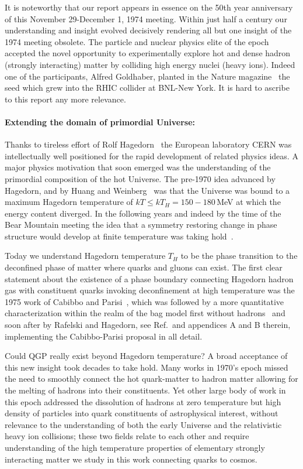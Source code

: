 It is noteworthy that our report appears in essence on the 50th year anniversary of this November 29-December 1, 1974 meeting. Within just half a century our understanding and insight evolved decisively rendering all but one insight of the 1974 meeting obsolete. The particle and nuclear physics elite  of the epoch accepted the novel opportunity to experimentally explore hot and dense hadron (strongly interacting) matter by colliding high energy nuclei (heavy ions). Indeed one of the participants, Alfred Goldhaber, planted in the Nature magazine~\cite{Goldhaber:1978qp} the seed which grew into the RHIC collider at BNL-New York. It is hard to ascribe to this report any more relevance.

\paragraph{Extending the domain of primordial Universe:}Thanks to tireless effort of Rolf Hagedorn~\cite{Rafelski:2016hnq} the European laboratory CERN was intellectually well positioned for the rapid development of related physics ideas. A major physics motivation that soon emerged was the understanding of the primordial composition of the hot Universe. The pre-1970 idea advanced by Hagedorn, and by Huang and Weinberg~\cite{Huang:1970iq} was that the Universe was bound to a maximum Hagedorn temperature of $kT\le kT_H=150-180$\,MeV at which the energy content diverged. In the following years and indeed by the time of the Bear Mountain meeting the idea that a symmetry restoring change in phase structure would develop at finite temperature was taking hold~\cite{Weinberg:1974hy,Harrington:1974fc}.

Today we understand Hagedorn temperature $T_H$ to be the phase transition to the deconfined phase of matter where quarks and gluons can exist. The first clear statement about the existence of a phase boundary connecting Hagedorn hadron gas with constituent quarks invoking deconfinement at high temperature was the 1975 work of Cabibbo and Parisi~\cite{Cabibbo:1975ig}, which was followed by a more quantitative characterization within the realm of the bag model first without hadrons~\cite{Chin:1978gj} and soon after by Rafelski and Hagedorn, see Ref.\,\cite{Rafelski:2015cxa} and appendices A and B therein, implementing the Cabibbo-Parisi proposal in all detail.

Could QGP really exist beyond Hagedorn temperature? A broad acceptance of this new insight took decades to take hold. Many works in 1970's epoch missed the need to smoothly connect the hot quark-matter to hadron matter allowing for the melting of hadrons into their constituents. Yet other large body of work in this epoch addressed the dissolution of hadrons at zero temperature but high density of particles into quark constituents of astrophysical interest, without relevance to the understanding of both the early Universe and the relativistic heavy ion collisions; these two fields relate to each other and require understanding of the high temperature properties of elementary strongly interacting matter we study in this work connecting quarks to cosmos.
 
